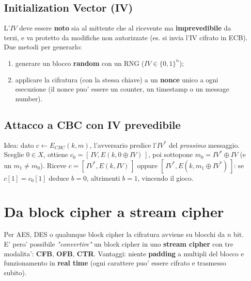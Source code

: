 \subsection{Initialization Vector (IV)}
L'$ IV $ deve essere \textbf{noto} sia al mittente che al ricevente ma \textbf{imprevedibile} da terzi, e va protetto da modifiche non autorizzate (es. si invia l'IV cifrato in ECB). Due metodi per generarlo:
\begin{enumerate}
  \item generare un blocco \textbf{random} con un RNG ($ IV \in \{0,1\}^n $);
  \item applicare la cifratura (con la stessa chiave) a un \textbf{nonce} unico a ogni esecuzione (il nonce puo' essere un counter, un timestamp o un message number).
\end{enumerate}

\subsection{Attacco a CBC con IV prevedibile}
Idea: dato $ c \leftarrow E_{CBC}(k, m) $, l'avversario predice l'$ IV^* $ del \textit{prossimo} messaggio. Sceglie $ 0 \in X $, ottiene $ c_0 = [\, IV, E(k, 0 \oplus IV) \,] $, poi sottopone $ m_0 = IV^* \oplus IV $ (e un $ m_1 \neq m_0 $). Riceve $ c = [\, IV^*, E(k, IV) \,] $ oppure $ [\, IV^*, E(k, m_1 \oplus IV^*) \,] $: se $ c[1] = c_0[1] $ deduce $ b = 0 $, altrimenti $ b = 1 $, vincendo il gioco.

\section{Da block cipher a stream cipher}
Per AES, DES o qualunque block cipher la cifratura avviene su blocchi da $ n $ bit. E' pero' possibile \textit{"convertire"} un block cipher in uno \textbf{stream cipher} con tre modalita': \textbf{CFB}, \textbf{OFB}, \textbf{CTR}. Vantaggi: niente \textbf{padding} a multipli del blocco e funzionamento in \textbf{real time} (ogni carattere puo' essere cifrato e trasmesso subito).

